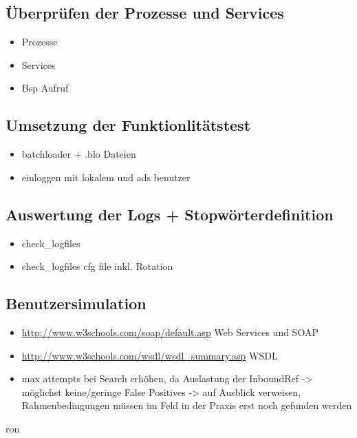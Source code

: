 \subsection{Überprüfen der Prozesse und Services}
\begin{itemize}
\item Prozesse
\item Services
\item Bsp Aufruf
\end{itemize}

\subsection{Umsetzung der Funktionlitätstest}
\begin{itemize}
\item batchloader + .blo Dateien
\item einloggen mit lokalem und ads benutzer
\end{itemize}



\subsection{Auswertung der Logs + Stopwörterdefinition}
\begin{itemize}
\item check\_logfiles
\item check\_logfiles cfg file inkl. Rotation
\end{itemize}

\subsection{Benutzersimulation}





\begin{itemize}
\item \url{http://www.w3schools.com/soap/default.asp} Web Services und SOAP
\item \url{http://www.w3schools.com/wsdl/wsdl_summary.asp} WSDL
\item max attempts bei Search erhöhen, da Auslastung der InboundRef -> möglichst keine/geringe False Positives -> auf Ausblick verweisen, Rahmenbedingungen müssen im Feld in der Praxis erst noch gefunden werden
\end{itemize}ron

